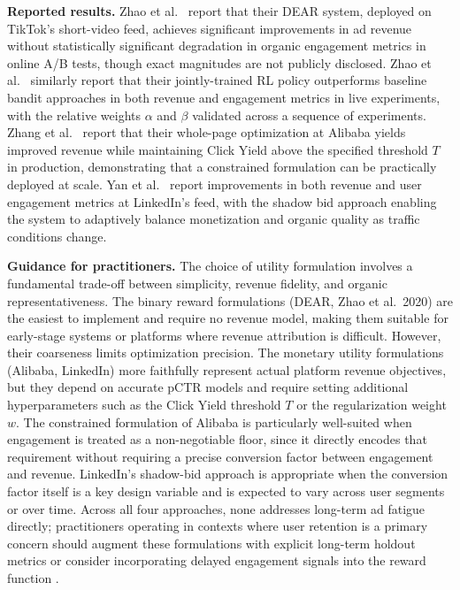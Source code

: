 \documentclass[manuscript,review,screen]{acmart}
\begin{document}
\textbf{Reported results.}
Zhao et al.\ \cite{zhao2021dear} report that their DEAR system, deployed on TikTok's short-video feed, achieves significant improvements in ad revenue without statistically significant degradation in organic engagement metrics in online A/B tests, though exact magnitudes are not publicly disclosed. Zhao et al.\ \cite{zhao2020jointly} similarly report that their jointly-trained RL policy outperforms baseline bandit approaches in both revenue and engagement metrics in live experiments, with the relative weights $\alpha$ and $\beta$ validated across a sequence of experiments. Zhang et al.\ \cite{zhang2018whole} report that their whole-page optimization at Alibaba yields improved revenue while maintaining Click Yield above the specified threshold $T$ in production, demonstrating that a constrained formulation can be practically deployed at scale. Yan et al.\ \cite{yan2020ads} report improvements in both revenue and user engagement metrics at LinkedIn's feed, with the shadow bid approach enabling the system to adaptively balance monetization and organic quality as traffic conditions change.

\textbf{Guidance for practitioners.}
The choice of utility formulation involves a fundamental trade-off between simplicity, revenue fidelity, and organic representativeness. The binary reward formulations (DEAR, Zhao et al.\ 2020) are the easiest to implement and require no revenue model, making them suitable for early-stage systems or platforms where revenue attribution is difficult. However, their coarseness limits optimization precision. The monetary utility formulations (Alibaba, LinkedIn) more faithfully represent actual platform revenue objectives, but they depend on accurate pCTR models and require setting additional hyperparameters such as the Click Yield threshold $T$ or the regularization weight $w$. The constrained formulation of Alibaba is particularly well-suited when engagement is treated as a non-negotiable floor, since it directly encodes that requirement without requiring a precise conversion factor between engagement and revenue. LinkedIn's shadow-bid approach is appropriate when the conversion factor itself is a key design variable and is expected to vary across user segments or over time. Across all four approaches, none addresses long-term ad fatigue directly; practitioners operating in contexts where user retention is a primary concern should augment these formulations with explicit long-term holdout metrics \cite{hohnhold2015focusing} or consider incorporating delayed engagement signals into the reward function \cite{mcdonald2023impatient}.
\end{document}
